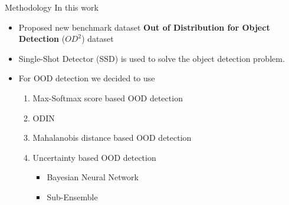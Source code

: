 \documentclass[10pt, aspectratio=169]{beamer}
\begin{document}
\begin{frame}{Methodology}
    In this work
    \begin{itemize}
        \item Proposed new benchmark dataset \textbf{Out of Distribution for Object Detection} ($OD^2$) dataset
        \item Single-Shot Detector (SSD) is used to solve the object detection problem.
        \item For OOD detection we decided to use
        \begin{enumerate}
            \item Max-Softmax score based OOD detection \citep{hendrycks17baseline}
            \item ODIN \citep{liang2017enhancing}
            \item Mahalanobis distance based OOD detection \citep{Lee2018}
            \item Uncertainty based OOD detection \citep{Malinin2018, Lakshminarayanan2017}
                \begin{itemize}
                    \item Bayesian Neural Network
                    \item Sub-Ensemble
                \end{itemize} 
        \end{enumerate}
    \end{itemize}
\end{frame}
\end{document}
